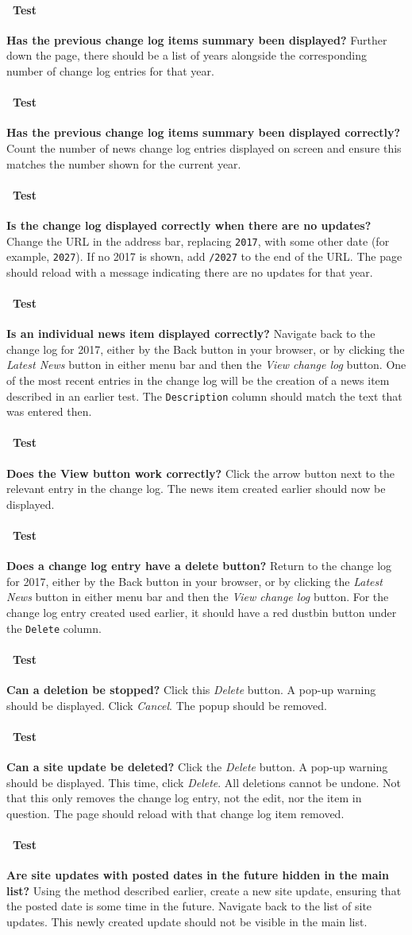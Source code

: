 \documentclass[12pt]{article}
\newcounter{Test}
\newcommand{\test}[1]{%
\stepcounter{Test}%
\paragraph{\Circle\ Test \theTest} \textbf{#1} }
\begin{document}
\test{Has the previous change log items summary been displayed?}
Further down the page, there should be a list of years alongside the corresponding number of change log entries for that year.

\test{Has the previous change log items summary been displayed correctly?}
Count the number of news change log entries displayed on screen and ensure this matches the number shown for the current year.

\test{Is the change log displayed correctly when there are no updates?}
Change the URL in the address bar, replacing \texttt{2017}, with some other date (for example, \texttt{2027}). If no 2017 is shown, add \texttt{/2027} to the end of the URL. The page should reload with a message indicating there are no updates for that year.

\test{Is an individual news item displayed correctly?}
Navigate back to the change log for 2017, either by the Back button in your browser, or by clicking the \textit{Latest News} button in either menu bar and then the \textit{View change log} button. One of the most recent entries in the change log will be the creation of a news item described in an earlier test. The \texttt{Description} column should match the text that was entered then.

\test{Does the View button work correctly?}
Click the arrow button next to the relevant entry in the change log. The news item created earlier should now be displayed.

\test{Does a change log entry have a delete button?}
Return to the change log for 2017, either by the Back button in your browser, or by clicking the \textit{Latest News} button in either menu bar and then the \textit{View change log} button. For the change log entry created used earlier, it should have a red dustbin button under the \texttt{Delete} column.

\test{Can a deletion be stopped?}
Click this \textit{Delete} button. A pop-up warning should be displayed. Click \textit{Cancel}. The popup should be removed.

\test{Can a site update be deleted?}
Click the \textit{Delete} button. A pop-up warning should be displayed. This time, click \textit{Delete}. All deletions cannot be undone. Not that this only removes the change log entry, not the edit, nor the item in question. The page should reload with that change log item removed.

\test{Are site updates with posted dates in the future hidden in the main list?}
Using the method described earlier, create a new site update, ensuring that the posted date is some time in the future. Navigate back to the list of site updates. This newly created update should not be visible in the main list.
\end{document}
